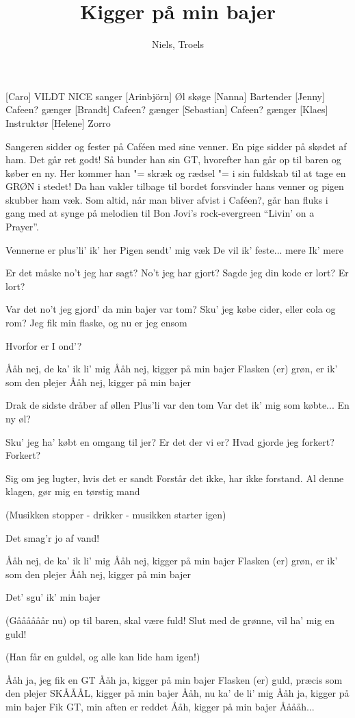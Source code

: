 \documentclass[a4paper,11pt]{article}
\title{Kigger på min bajer}
\author{Niels, Troels}
\begin{document}
\maketitle

\begin{roles}
[Caro] VILDT NICE sanger
[Arinbjörn] Øl skøge
[Nanna] Bartender
[Jenny] Cafeen? gænger
[Brandt] Cafeen? gænger
[Sebastian] Cafeen? gænger
[Klaes] Instruktør
[Helene] Zorro
\end{roles}

Sangeren sidder og fester på Caféen med sine venner.  En pige sidder
på skødet af ham.  Det går ret godt!  Så bunder han sin GT, hvorefter
han går op til baren og køber en ny.  Her kommer han "= skræk og
rædsel "= i sin fuldskab til at tage en GRØN i stedet!  Da han vakler
tilbage til bordet forsvinder hans venner og pigen skubber ham væk.
Som altid, når man bliver afvist i Caféen?, går han fluks i gang med
at synge på melodien til Bon Jovi's rock-evergreen "`Livin' on a
Prayer"'.

\begin{song}

Vennerne er plus'li' ik' her
Pigen sendt' mig væk
De vil ik' feste... mere
Ik' mere

Er det måske no't jeg har sagt?
No't jeg har gjort?
Sagde jeg din kode er lort?
Er lort?

Var det no't jeg gjord' da min bajer var tom?
Sku' jeg købe cider, eller cola og rom?
Jeg fik min flaske, og nu er jeg ensom

Hvorfor er I ond'?

Ååh nej, de ka' ik li' mig
Ååh nej, kigger på min bajer
Flasken (er) grøn, er ik' som den plejer
Ååh nej, kigger på min bajer

Drak de sidste dråber af øllen
Plus'li var den tom
Var det ik' mig som købte...
En ny øl?

Sku' jeg ha' købt en omgang til jer?
Er det der vi er?
Hvad gjorde jeg forkert?
Forkert?

Sig om jeg lugter, hvis det er sandt
Forstår det ikke, har ikke forstand.
Al denne klagen, gør mig en tørstig mand

(Musikken stopper - drikker - musikken starter igen)

Det smag'r jo af vand!

Ååh nej, de ka' ik li' mig
Ååh nej, kigger på min bajer
Flasken (er) grøn, er ik' som den plejer
Ååh nej, kigger på min bajer

Det' sgu' ik' min bajer

(Gåååååår nu) op til baren, skal være fuld!
Slut med de grønne, vil ha' mig en guld!

(Han får en guldøl, og alle kan lide ham igen!)

Ååh ja, jeg fik en GT
Ååh ja, kigger på min bajer
Flasken (er) guld, præcis som den plejer
SKÅÅÅL, kigger på min bajer
Ååh, nu ka' de li' mig
Ååh ja, kigger på min bajer
Fik GT, min aften er reddet
Ååh, kigger på min bajer
Ååååh...
\end{song}
\end{document}
